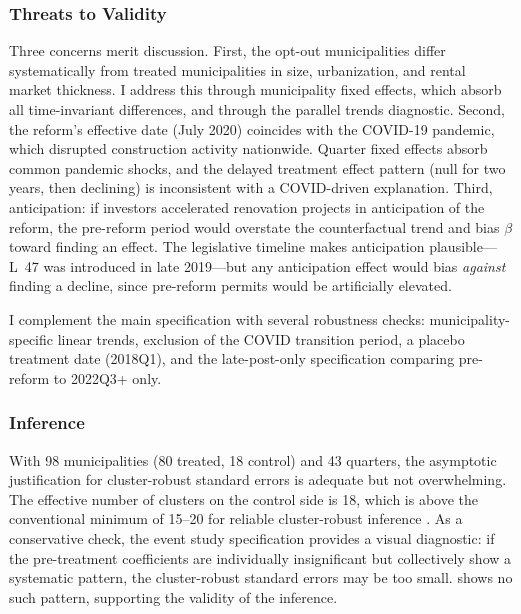 \documentclass[12pt]{article}
\begin{document}
\subsubsection*{Threats to Validity} Three concerns merit discussion. First, the opt-out municipalities differ systematically from treated municipalities in size, urbanization, and rental market thickness. I address this through municipality fixed effects, which absorb all time-invariant differences, and through the parallel trends diagnostic. Second, the reform's effective date (July 2020) coincides with the COVID-19 pandemic, which disrupted construction activity nationwide. Quarter fixed effects absorb common pandemic shocks, and the delayed treatment effect pattern (null for two years, then declining) is inconsistent with a COVID-driven explanation. Third, anticipation: if investors accelerated renovation projects in anticipation of the reform, the pre-reform period would overstate the counterfactual trend and bias $\beta$ toward finding an effect. The legislative timeline makes anticipation plausible---L~47 was introduced in late 2019---but any anticipation effect would bias \emph{against} finding a decline, since pre-reform permits would be artificially elevated.

I complement the main specification with several robustness checks: municipality-specific linear trends, exclusion of the COVID transition period, a placebo treatment date (2018Q1), and the late-post-only specification comparing pre-reform to 2022Q3+ only.

\subsubsection*{Inference} With 98 municipalities (80 treated, 18 control) and 43 quarters, the asymptotic justification for cluster-robust standard errors is adequate but not overwhelming. The effective number of clusters on the control side is 18, which is above the conventional minimum of 15--20 for reliable cluster-robust inference \citep{bertrand2004}. As a conservative check, the event study specification provides a visual diagnostic: if the pre-treatment coefficients are individually insignificant but collectively show a systematic pattern, the cluster-robust standard errors may be too small.  shows no such pattern, supporting the validity of the inference.
\end{document}
